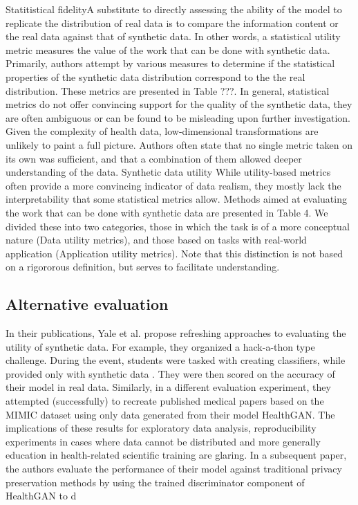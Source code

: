 Statitistical fidelityA substitute to directly assessing the ability of the model to replicate the distribution of real data is to compare the information content or the real data against that of synthetic data. In other words, a statistical utility metric measures the value of the work that can be done with synthetic data. Primarily, authors attempt by various measures to determine if the statistical properties of the synthetic data distribution correspond to the the real distribution. These metrics are presented in Table ???. In general, statistical metrics do not offer convincing support for the quality of the synthetic data, they are often ambiguous or can be found to be misleading upon further investigation. Given the complexity of health data, low-dimensional transformations are unlikely to paint a full picture. Authors often state that no single metric taken on its own was sufficient, and that a combination of them allowed deeper understanding of the data. Synthetic data utility While utility-based metrics often provide a more convincing indicator of data realism, they mostly lack the interpretability that some statistical metrics allow. Methods aimed at evaluating the work that can be done with synthetic data are presented in Table 4. We divided these into two categories, those in which the task is of a more conceptual nature (Data utility metrics), and those based on tasks with real-world application (Application utility metrics). Note that this distinction is not based on a rigororous definition, but serves to facilitate understanding.



%

\subsection{Alternative evaluation}
In their publications, Yale et al. propose refreshing approaches to evaluating the utility of synthetic data. For example, they organized a hack-a-thon type challenge. During the event, students were tasked with creating classifiers, while provided only with synthetic data \cite{Yale_2020}. They were then scored on the accuracy of their model in real data. Similarly, in a different evaluation experiment, they attempted (successfully) to recreate published medical papers based on the MIMIC dataset using only data generated from their model HealthGAN. The implications of these results for exploratory data analysis, reproducibility experiments in cases where data cannot be distributed and more generally education in health-related scientific training are glaring. In a subsequent paper, the authors evaluate the performance of their model against traditional privacy preservation methods by using the trained discriminator component of HealthGAN to d
